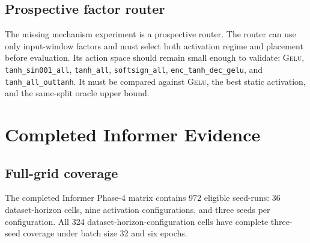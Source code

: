 \documentclass{article}
\newcommand{\gelu}{\textsc{Gelu}}
\begin{document}
\subsection{Prospective factor router}

The missing mechanism experiment is a prospective router. The router can use only input-window factors and must select both activation regime and placement before evaluation. Its action space should remain small enough to validate: \gelu{}, \texttt{tanh\_sin001\_all}, \texttt{tanh\_all}, \texttt{softsign\_all}, \texttt{enc\_tanh\_dec\_gelu}, and \texttt{tanh\_all\_outtanh}. It must be compared against \gelu{}, the best static activation, and the same-split oracle upper bound.

\begin{table}[!htbp]
\centering
\caption{Candidate prospective routers. Results are intentionally left pending in this hypothesis draft.}
\label{tab:router_forms}
\end{table}

\section{Completed Informer Evidence}

\subsection{Full-grid coverage}

The completed Informer Phase-4 matrix contains 972 eligible seed-runs: 36 dataset-horizon cells, nine activation configurations, and three seeds per configuration. All 324 dataset-horizon-configuration cells have complete three-seed coverage under batch size 32 and six epochs.
\end{document}
